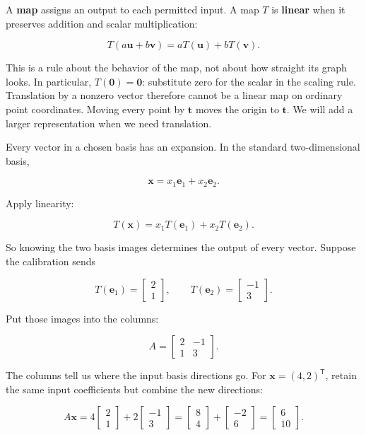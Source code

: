 A \textbf{map} assigns an output to each permitted input. A map \(T\) is \textbf{linear} when it preserves addition and scalar multiplication:

\[
T(a\mathbf u+b\mathbf v)=aT(\mathbf u)+bT(\mathbf v).
\]

This is a rule about the behavior of the map, not about how straight its graph looks. In particular, \(T(\mathbf0)=\mathbf0\): substitute zero for the scalar in the scaling rule. Translation by a nonzero vector therefore cannot be a linear map on ordinary point coordinates. Moving every point by \(\mathbf t\) moves the origin to \(\mathbf t\). We will add a larger representation when we need translation.

Every vector in a chosen basis has an expansion. In the standard two-dimensional basis,

\[
\mathbf x=x_1\mathbf e_1+x_2\mathbf e_2.
\]

Apply linearity:

\[
T(\mathbf x)=x_1T(\mathbf e_1)+x_2T(\mathbf e_2).
\]

So knowing the two basis images determines the output of every vector. Suppose the calibration sends

\[
T(\mathbf e_1)=\begin{bmatrix}2\\1\end{bmatrix},\qquad
T(\mathbf e_2)=\begin{bmatrix}-1\\3\end{bmatrix}.
\]

Put those images into the columns:

\[
A=\begin{bmatrix}2&-1\\1&3\end{bmatrix}.
\]

The columns tell us where the input basis directions go. For \(\mathbf x=(4,2)^{\mathsf T}\), retain the same input coefficients but combine the new directions:

\[
A\mathbf x
=4\begin{bmatrix}2\\1\end{bmatrix}
+2\begin{bmatrix}-1\\3\end{bmatrix}
=\begin{bmatrix}8\\4\end{bmatrix}+\begin{bmatrix}-2\\6\end{bmatrix}
=\begin{bmatrix}6\\10\end{bmatrix}.
\]

